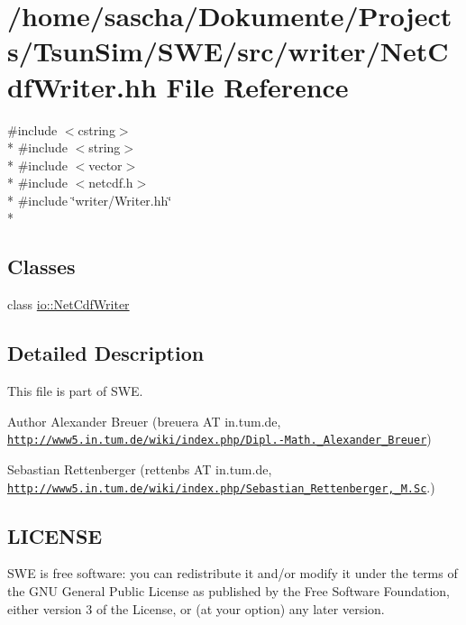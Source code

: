 \hypertarget{NetCdfWriter_8hh}{\section{/home/sascha/\-Dokumente/\-Projects/\-Tsun\-Sim/\-S\-W\-E/src/writer/\-Net\-Cdf\-Writer.hh File Reference}
\label{NetCdfWriter_8hh}
}
{\ttfamily \#include $<$cstring$>$}\\*
{\ttfamily \#include $<$string$>$}\\*
{\ttfamily \#include $<$vector$>$}\\*
{\ttfamily \#include $<$netcdf.\-h$>$}\\*
{\ttfamily \#include \char`\"{}writer/\-Writer.\-hh\char`\"{}}\\*
\subsection*{Classes}
\begin{DoxyCompactItemize}
\item 
class \hyperlink{classio_1_1NetCdfWriter}{io\-::\-Net\-Cdf\-Writer}
\end{DoxyCompactItemize}


\subsection{Detailed Description}
This file is part of S\-W\-E.

\begin{DoxyAuthor}{Author}
Alexander Breuer (breuera A\-T in.\-tum.\-de, \href{http://www5.in.tum.de/wiki/index.php/Dipl.-Math._Alexander_Breuer}{\tt http\-://www5.\-in.\-tum.\-de/wiki/index.\-php/\-Dipl.-\/\-Math.\-\_\-\-Alexander\-\_\-\-Breuer}) 

Sebastian Rettenberger (rettenbs A\-T in.\-tum.\-de, \href{http://www5.in.tum.de/wiki/index.php/Sebastian_Rettenberger,_M.Sc}{\tt http\-://www5.\-in.\-tum.\-de/wiki/index.\-php/\-Sebastian\-\_\-\-Rettenberger,\-\_\-\-M.\-Sc}.)
\end{DoxyAuthor}
\hypertarget{Writer_8hh_LICENSE}{}\subsection{L\-I\-C\-E\-N\-S\-E}\label{Writer_8hh_LICENSE}
S\-W\-E is free software\-: you can redistribute it and/or modify it under the terms of the G\-N\-U General Public License as published by the Free Software Foundation, either version 3 of the License, or (at your option) any later version.

